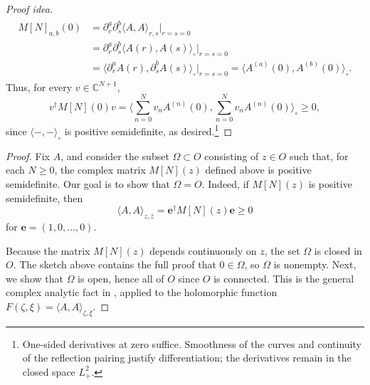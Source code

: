 \documentclass[11pt, letterpaper, reqno]{amsart}
\theoremstyle{definition}
\theoremstyle{remark}
\newcommand{\bbC}{\mathbb{C}}
\newcommand{\bfe}{\mathbf{e}}
\begin{document}
\begin{proof}[Proof idea]
\begin{align}
\begin{split}
 M[N]_{a,b}(0)
 &=\partial_r^a\partial_s^b\langle A,A\rangle_{r,s}
       \Big|_{r=s=0}\\
 &=\partial_r^a\partial_s^b\langle A(r),A(s)\rangle_\circ
       \Big|_{r=s=0}\\
 &=\langle\partial_r^a A(r),\partial_s^b A(s)\rangle_\circ
       \Big|_{r=s=0}
 =\langle A^{(a)}(0),A^{(b)}(0)\rangle_\circ.
\end{split}
\end{align}
Thus, for every $v\in\bbC^{N+1}$,
\begin{equation}
 v^\dagger M[N](0)v
 =\Big\langle\sum_{n=0}^Nv_nA^{(n)}(0),
              \sum_{n=0}^Nv_nA^{(n)}(0)\Big\rangle_\circ\geq0,
\end{equation}
since $\langle-,-\rangle_\circ$ is positive semidefinite, as
desired.\footnote{One-sided derivatives at zero suffice. Smoothness
of the curves and continuity of the reflection pairing justify
differentiation; the derivatives remain in the closed space $L_+^2$.}
\end{proof}

\begin{proof}
Fix $A$, and consider the subset $\Omega\subset O$ consisting of
$z\in O$ such that, for each $N\geq0$, the complex matrix $M[N](z)$
defined above is positive semidefinite.
Our goal is to show that $\Omega=O$. Indeed, if $M[N](z)$ is
positive semidefinite, then
\begin{equation}
 \langle A,A\rangle_{z,\bar z}
 =\bfe^\dagger M[N](z)\bfe\geq0
\end{equation}
for $\bfe=(1,0,\dots,0)$.

Because the matrix $M[N](z)$ depends continuously on $z$, the set
$\Omega$ is closed in $O$.
The sketch above contains the full proof that $0\in\Omega$, so
$\Omega$ is nonempty.
Next, we show that $\Omega$ is open, hence all of $O$ since $O$ is
connected. This is the general complex analytic fact in
, applied to the holomorphic function
$F(\zeta,\xi)=\langle A,A\rangle_{\zeta,\xi}$.
\end{proof}
\end{document}
